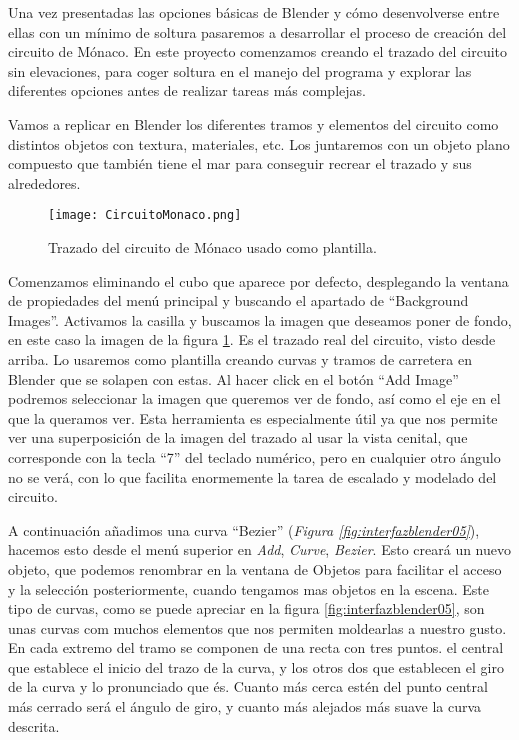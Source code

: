 Una vez presentadas las opciones básicas de Blender y cómo desenvolverse entre ellas con un mínimo de soltura pasaremos a desarrollar el proceso de creación del circuito de Mónaco. En este proyecto comenzamos creando el trazado del circuito  sin elevaciones, para coger soltura en el manejo del programa y explorar las diferentes opciones antes de realizar tareas más complejas. 

Vamos a replicar en Blender los diferentes tramos y elementos del circuito como distintos objetos con textura, materiales, etc. Los juntaremos con un objeto plano compuesto que también tiene el mar para conseguir recrear el trazado y sus alrededores.

\begin{figure}[ht]
	\centering
	\texttt{[image: CircuitoMonaco.png]}
	\caption{Trazado del circuito de Mónaco usado como plantilla.} \label{fig:circuitomonaco}
\end{figure}

Comenzamos eliminando el cubo que aparece por defecto, desplegando la ventana de propiedades del menú principal y buscando el apartado de “Background Images”. Activamos la casilla y buscamos la imagen que deseamos poner de fondo, en este caso la imagen de la figura  \ref{fig:circuitomonaco}. Es el trazado real del circuito, visto desde arriba. Lo usaremos como plantilla creando curvas y tramos de carretera en Blender que se solapen con estas. Al hacer click en el botón “Add Image” podremos seleccionar la imagen que queremos ver de fondo, así como el eje en el que la queramos ver. Esta herramienta es especialmente útil ya que  nos permite ver una superposición de la imagen del trazado al usar la vista cenital, que corresponde con la tecla “7” del teclado numérico, pero en cualquier otro ángulo no se verá, con lo que facilita enormemente la tarea de escalado y modelado del circuito.

A continuación añadimos una curva “Bezier” (\textit{Figura \ref{fig:interfazblender05}}), hacemos esto desde el menú superior en \textit{Add}, \textit{Curve}, \textit{Bezier}. Esto creará un nuevo objeto, que podemos renombrar en la ventana de Objetos para facilitar el acceso y la selección posteriormente, cuando tengamos mas objetos en la escena. Este tipo de curvas, como se puede apreciar en la figura \ref{fig:interfazblender05}, son unas curvas com muchos elementos que nos permiten moldearlas a nuestro gusto. En cada extremo del tramo se componen de una recta con tres puntos. el central que establece el inicio del trazo de la curva, y los otros dos que establecen el giro de la curva y lo pronunciado que és. Cuanto más cerca estén del punto central más cerrado será el ángulo de giro, y cuanto más alejados más suave la curva descrita.

